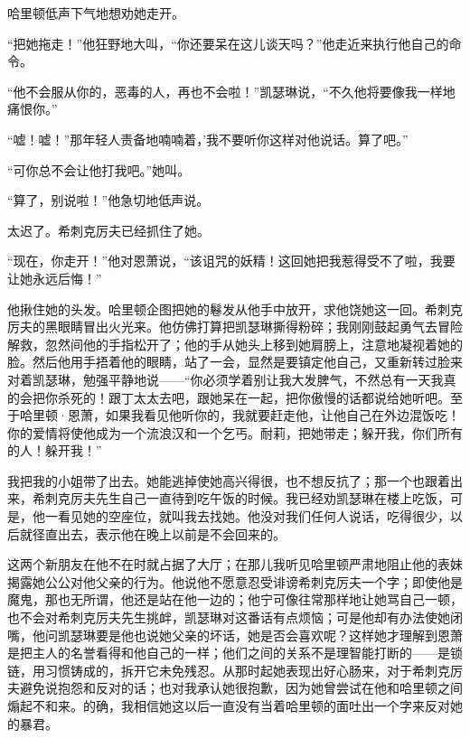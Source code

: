\par 哈里顿低声下气地想劝她走开。
\par “把她拖走！”他狂野地大叫，“你还要呆在这儿谈天吗？”他走近来执行他自己的命令。
\par “他不会服从你的，恶毒的人，再也不会啦！”凯瑟琳说，“不久他将要像我一样地痛恨你。”
\par “嘘！嘘！”那年轻人责备地喃喃着，’我不要听你这样对他说话。算了吧。”
\par “可你总不会让他打我吧。”她叫。
\par “算了，别说啦！”他急切地低声说。
\par 太迟了。希刺克厉夫已经抓住了她。
\par “现在，你走开！”他对恩萧说，“该诅咒的妖精！这回她把我惹得受不了啦，我要让她永远后悔！”
\par 他揪住她的头发。哈里顿企图把她的鬈发从他手中放开，求他饶她这一回。希刺克厉夫的黑眼睛冒出火光来。他仿佛打算把凯瑟琳撕得粉碎；我刚刚鼓起勇气去冒险解救，忽然间他的手指松开了；他的手从她头上移到她肩膀上，注意地凝视着她的脸。然后他用手捂着他的眼睛，站了一会，显然是要镇定他自己，又重新转过脸来对着凯瑟琳，勉强平静地说——“你必须学着别让我大发脾气，不然总有一天我真的会把你杀死的！跟丁太太去吧，跟她呆在一起，把你傲慢的话都说给她听吧。至于哈里顿·恩萧，如果我看见他听你的，我就要赶走他，让他自己在外边混饭吃！你的爱情将使他成为一个流浪汉和一个乞丐。耐莉，把她带走；躲开我，你们所有的人！躲开我！”
\par 我把我的小姐带了出去。她能逃掉使她高兴得很，也不想反抗了；那一个也跟着出来，希刺克厉夫先生自己一直待到吃午饭的时候。我已经劝凯瑟琳在楼上吃饭，可是，他一看见她的空座位，就叫我去找她。他没对我们任何人说话，吃得很少，以后就径直出去，表示他在晚上以前是不会回来的。
\par 这两个新朋友在他不在时就占据了大厅；在那儿我听见哈里顿严肃地阻止他的表妹揭露她公公对他父亲的行为。他说他不愿意忍受诽谤希刺克厉夫一个字；即使他是魔鬼，那也无所谓，他还是站在他一边的；他宁可像往常那样地让她骂自己一顿，也不会对希刺克厉夫先生挑衅，凯瑟琳对这番话有点烦恼；可是他却有办法使她闭嘴，他问凯瑟琳要是他也说她父亲的坏话，她是否会喜欢呢？这样她才理解到恩萧是把主人的名誉看得和他自己的一样；他们之间的关系不是理智能打断的——是锁链，用习惯铸成的，拆开它未免残忍。从那时起她表现出好心肠来，对于希刺克厉夫避免说抱怨和反对的话；也对我承认她很抱歉，因为她曾尝试在他和哈里顿之间煽起不和来。的确，我相信她这以后一直没有当着哈里顿的面吐出一个字来反对她的暴君。
